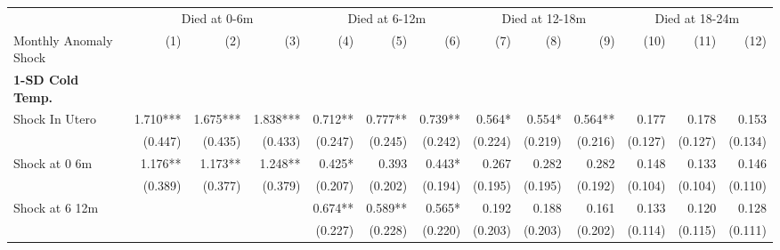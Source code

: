 \begin{tabular}{lrrrrrrrrrrrr}
\toprule
                                            &  \multicolumn{3}{c}{Died at 0-6m} & \multicolumn{3}{c}{Died at 6-12m} & \multicolumn{3}{c}{Died at 12-18m} & \multicolumn{3}{c}{Died at 18-24m} \\ 
                                                \cmidrule(lr){2-4}                          \cmidrule(lr){5-7}                          \cmidrule(lr){8-10}                           \cmidrule(lr){11-13}                        
Monthly Anomaly Shock                       &          (1) &          (2) &          (3) &          (4) &          (5) &          (6) &          (7) &          (8) &           (9) &         (10) &         (11) &          (12) \\ 
\midrule
\textbf{1-SD Cold Temp.}                    &              &              &              &              &              &              &              &              &               &              &              &               \\ 
Shock In Utero                              &     1.710*** &     1.675*** &     1.838*** &      0.712** &      0.777** &      0.739** &       0.564* &       0.554* &       0.564** &        0.177 &        0.178 &         0.153 \\ 
                                            &      (0.447) &      (0.435) &      (0.433) &      (0.247) &      (0.245) &      (0.242) &      (0.224) &      (0.219) &       (0.216) &      (0.127) &      (0.127) &       (0.134) \\ 
Shock at 0 6m                               &      1.176** &      1.173** &      1.248** &       0.425* &        0.393 &       0.443* &        0.267 &        0.282 &         0.282 &        0.148 &        0.133 &         0.146 \\ 
                                            &      (0.389) &      (0.377) &      (0.379) &      (0.207) &      (0.202) &      (0.194) &      (0.195) &      (0.195) &       (0.192) &      (0.104) &      (0.104) &       (0.110) \\ 
Shock at 6 12m                              &              &              &              &      0.674** &      0.589** &       0.565* &        0.192 &        0.188 &         0.161 &        0.133 &        0.120 &         0.128 \\ 
                                            &              &              &              &      (0.227) &      (0.228) &      (0.220) &      (0.203) &      (0.203) &       (0.202) &      (0.114) &      (0.115) &       (0.111) \\ 

\end{tabular}
